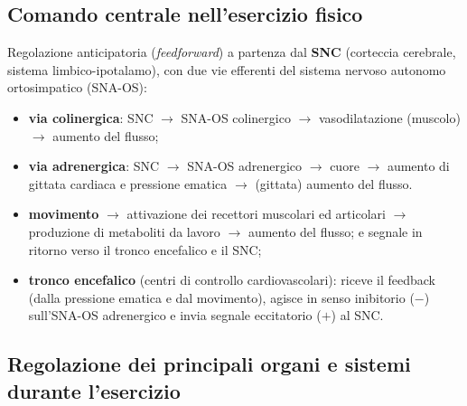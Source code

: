 \subsection{Comando centrale nell'esercizio fisico}

Regolazione anticipatoria (\textit{feedforward}) a partenza dal \textbf{SNC} (corteccia cerebrale,
sistema limbico-ipotalamo), con due vie efferenti del sistema nervoso autonomo ortosimpatico
(SNA-OS):
\begin{itemize}
  \item \textbf{via colinergica}: SNC $\rightarrow$ SNA-OS colinergico $\rightarrow$ vasodilatazione
    (muscolo) $\rightarrow$ aumento del flusso;
  \item \textbf{via adrenergica}: SNC $\rightarrow$ SNA-OS adrenergico $\rightarrow$ cuore
    $\rightarrow$ aumento di gittata cardiaca e pressione ematica $\rightarrow$ (gittata) aumento
    del flusso.
\end{itemize}

\begin{itemize}
  \item \textbf{movimento} $\rightarrow$ attivazione dei recettori muscolari ed articolari
    $\rightarrow$ produzione di metaboliti da lavoro $\rightarrow$ aumento del flusso; e segnale in
    ritorno verso il tronco encefalico e il SNC;
  \item \textbf{tronco encefalico} (centri di controllo cardiovascolari): riceve il feedback (dalla
    pressione ematica e dal movimento), agisce in senso inibitorio ($-$) sull'SNA-OS adrenergico e
    invia segnale eccitatorio ($+$) al SNC.
\end{itemize}

\subsection{Regolazione dei principali organi e sistemi durante l'esercizio}

